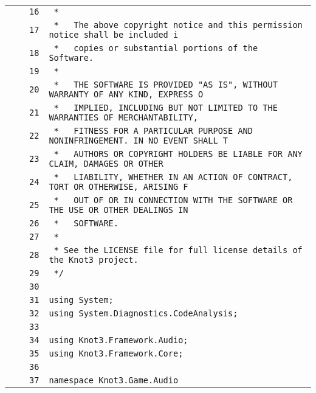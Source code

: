 \documentclass[a4paper,10pt]{article}
\begin{document}
\begin{longtable}[l]{lrrl}
\cellcolor{gray} &  & \verb~16~ & \verb~ *~\\
\cellcolor{gray} &  & \verb~17~ & \verb~ *   The above copyright notice and this permission notice shall be included i~\\
\cellcolor{gray} &  & \verb~18~ & \verb~ *   copies or substantial portions of the Software.~\\
\cellcolor{gray} &  & \verb~19~ & \verb~ *~\\
\cellcolor{gray} &  & \verb~20~ & \verb~ *   THE SOFTWARE IS PROVIDED "AS IS", WITHOUT WARRANTY OF ANY KIND, EXPRESS O~\\
\cellcolor{gray} &  & \verb~21~ & \verb~ *   IMPLIED, INCLUDING BUT NOT LIMITED TO THE WARRANTIES OF MERCHANTABILITY,~\\
\cellcolor{gray} &  & \verb~22~ & \verb~ *   FITNESS FOR A PARTICULAR PURPOSE AND NONINFRINGEMENT. IN NO EVENT SHALL T~\\
\cellcolor{gray} &  & \verb~23~ & \verb~ *   AUTHORS OR COPYRIGHT HOLDERS BE LIABLE FOR ANY CLAIM, DAMAGES OR OTHER~\\
\cellcolor{gray} &  & \verb~24~ & \verb~ *   LIABILITY, WHETHER IN AN ACTION OF CONTRACT, TORT OR OTHERWISE, ARISING F~\\
\cellcolor{gray} &  & \verb~25~ & \verb~ *   OUT OF OR IN CONNECTION WITH THE SOFTWARE OR THE USE OR OTHER DEALINGS IN~\\
\cellcolor{gray} &  & \verb~26~ & \verb~ *   SOFTWARE.~\\
\cellcolor{gray} &  & \verb~27~ & \verb~ *~\\
\cellcolor{gray} &  & \verb~28~ & \verb~ * See the LICENSE file for full license details of the Knot3 project.~\\
\cellcolor{gray} &  & \verb~29~ & \verb~ */~\\
\cellcolor{gray} &  & \verb~30~ & \verb~~\\
\cellcolor{gray} &  & \verb~31~ & \verb~using System;~\\
\cellcolor{gray} &  & \verb~32~ & \verb~using System.Diagnostics.CodeAnalysis;~\\
\cellcolor{gray} &  & \verb~33~ & \verb~~\\
\cellcolor{gray} &  & \verb~34~ & \verb~using Knot3.Framework.Audio;~\\
\cellcolor{gray} &  & \verb~35~ & \verb~using Knot3.Framework.Core;~\\
\cellcolor{gray} &  & \verb~36~ & \verb~~\\
\cellcolor{gray} &  & \verb~37~ & \verb~namespace Knot3.Game.Audio~\\

\end{longtable}
\end{document}
